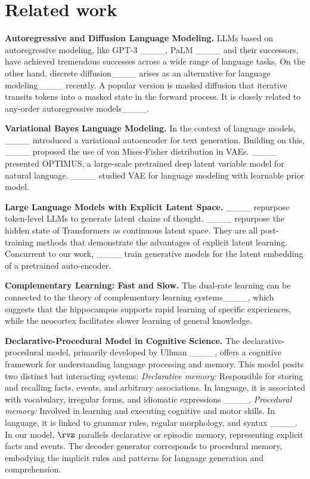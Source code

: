 \section{Related work}
{\bf Autoregressive and Diffusion Language Modeling.} LLMs based on autoregressive modeling, like GPT-3 ____, PaLM ____ and their successors, have achieved tremendous successes across a wide range of language tasks. On the other hand, discrete diffusion____ arises as an alternative for language modeling____ recently. A popular version is masked diffusion that iterative transits tokens into a masked state in the forward process. It is closely related to any-order autoregressive models____.

{\bf Variational Bayes Language Modeling.}
In the context of language models, ____ introduced a variational autoencoder for text generation. 
Building on this, ____ proposed the use of von Mises-Fisher distribution in VAEs. ____ presented OPTIMUS, a large-scale pretrained deep latent variable model for natural language. ____ studied VAE for language modeling with learnable prior model. 

{\bf Large Language Models with Explicit Latent Space.} ____ repurpose token-level LLMs to generate latent chains of thought. ____ repurpose the hidden state of Transformers as continuous latent space. They are all post-training methods that demonstrate the advantages of explicit latent learning. Concurrent to our work, ____ train generative models for the latent embedding of a pretrained auto-encoder. 

{\bf Complementary Learning: Fast and Slow.} The dual-rate learning can be connected to the theory of complementary learning systems____, which suggests that the hippocampus supports rapid learning of specific experiences, while the neocortex facilitates slower learning of general knowledge.

{\bf Declarative-Procedural Model in Cognitive Science.} The declarative-procedural model, primarily developed by Ullman ____, offers a cognitive framework for understanding language processing and memory. This model posits two distinct but interacting systems: \textit{Declarative memory:} Responsible for storing and recalling facts, events, and arbitrary associations. In language, it is associated with vocabulary, irregular forms, and idiomatic expressions ____. \textit{Procedural memory:} Involved in learning and executing cognitive and motor skills. In language, it is linked to grammar rules, regular morphology, and syntax ____. In our model, $\rvz$ parallels  declarative or episodic memory, representing explicit facts and events. The decoder generator corresponds to procedural memory, embodying the implicit rules and patterns for language generation and comprehension.

